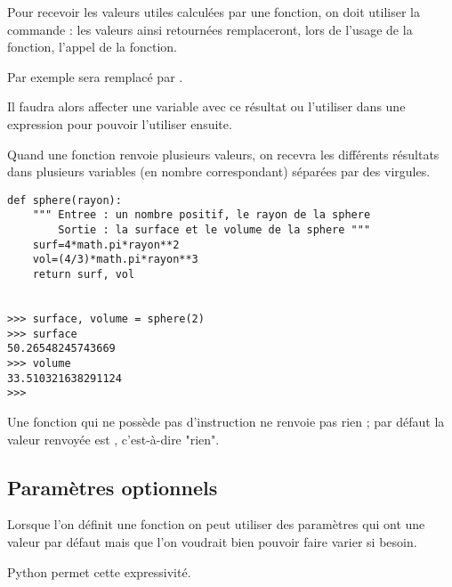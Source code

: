 Pour recevoir les valeurs utiles calculées par une fonction, on doit utiliser la commande  : les valeurs ainsi retournées remplaceront, lors de l'usage de la fonction, l'appel de la fonction.

Par exemple  sera remplacé par .

Il faudra alors affecter une variable avec ce résultat ou l'utiliser dans une expression pour pouvoir l'utiliser ensuite.

Quand une fonction renvoie plusieurs valeurs, on recevra les différents résultats dans plusieurs variables (en nombre correspondant) séparées par des virgules.

\begin{lstlisting}
def sphere(rayon):
    """ Entree : un nombre positif, le rayon de la sphere
        Sortie : la surface et le volume de la sphere """
    surf=4*math.pi*rayon**2
    vol=(4/3)*math.pi*rayon**3
    return surf, vol


>>> surface, volume = sphere(2)
>>> surface
50.26548245743669
>>> volume
33.510321638291124
>>> 
\end{lstlisting}
 Une fonction qui ne possède pas d'instruction  ne renvoie pas rien ; par défaut la valeur renvoyée est , c'est-à-dire "rien".
\subsection{Paramètres optionnels}
Lorsque l'on définit une fonction on peut utiliser des paramètres qui ont une valeur par défaut mais que l'on voudrait bien pouvoir faire varier si besoin.

Python permet cette expressivité.

